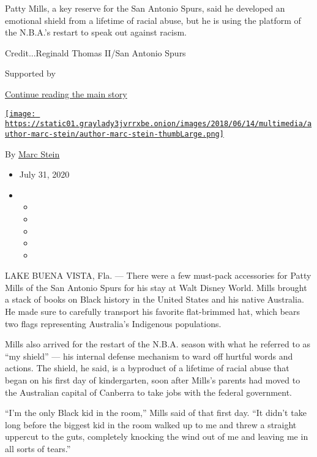 Patty Mills, a key reserve for the San Antonio Spurs, said he developed
an emotional shield from a lifetime of racial abuse, but he is using the
platform of the N.B.A.'s restart to speak out against racism.

Credit...Reginald Thomas II/San Antonio Spurs

Supported by

\protect\hyperlink{after-sponsor}{Continue reading the main story}

\href{https://www.nytimes3xbfgragh.onion/by/marc-stein}{\texttt{[image: https://static01.graylady3jvrrxbe.onion/images/2018/06/14/multimedia/author-marc-stein/author-marc-stein-thumbLarge.png]}}

By \href{https://www.nytimes3xbfgragh.onion/by/marc-stein}{Marc Stein}

\begin{itemize}
\item
  July 31, 2020
\item
  \begin{itemize}
  \item
  \item
  \item
  \item
  \item
  \end{itemize}
\end{itemize}

LAKE BUENA VISTA, Fla. --- There were a few must-pack accessories for
Patty Mills of the San Antonio Spurs for his stay at Walt Disney World.
Mills brought a stack of books on Black history in the United States and
his native Australia. He made sure to carefully transport his favorite
flat-brimmed hat, which bears two flags representing Australia's
Indigenous populations.

Mills also arrived for the restart of the N.B.A. season with what he
referred to as ``my shield'' --- his internal defense mechanism to ward
off hurtful words and actions. The shield, he said, is a byproduct of a
lifetime of racial abuse that began on his first day of kindergarten,
soon after Mills's parents had moved to the Australian capital of
Canberra to take jobs with the federal government.

``I'm the only Black kid in the room,'' Mills said of that first day.
``It didn't take long before the biggest kid in the room walked up to me
and threw a straight uppercut to the guts, completely knocking the wind
out of me and leaving me in all sorts of tears.''

